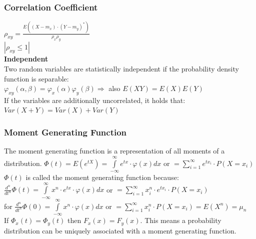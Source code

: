         \subsubsection{Correlation Coefficient}
		$\rho_{xy}=\frac{E((X-m_x)\cdot(Y-m_y)^*)}{\rho_x \rho_y}$\\
		$|\rho_{xy}\leq 1|$ \\ 
		\textbf{Independent}\\
        Two random variables are statistically independent if the probability density function is separable: \\
        $\varphi_{xy}(\alpha, \beta) = \varphi_x(\alpha)\varphi_y(\beta) \Longrightarrow$ also $E(XY)=E(X)E(Y)$ \\
        If the variables are additionally uncorrelated, it holds that: $Var(X+Y) = Var(X) + Var(Y)$


		\subsubsection{Moment Generating Function}
        The moment generating function is a representation of all moments of a distribution. 
        $\Phi(t)=E(e^{tX})=\int\limits_{-\infty}^\infty e^{tx} \cdot \varphi(x) dx$ or $= \sum\limits_{i=1}^{\infty}e^{tx_i} \cdot P(X=x_i)$  \\
        $\Phi(t)$ is called the moment generating function because: \\
        $\frac{d^n}{dt^n}\Phi(t)=\int\limits_{-\infty}^\infty x^n \cdot e^{tx} \cdot \varphi(x) dx$ or $= \sum\limits_{i=1}^{\infty} x_i^n \cdot e^{tx_i} \cdot P(X=x_i)$\\
        for $\frac{d^n}{dt^n}\Phi(0)=\int\limits_{-\infty}^\infty x^n \cdot \varphi(x) dx$ or $= \sum\limits_{i=1}^{\infty} x_i^n \cdot P(X=x_i) = E(X^n)=\mu_n $\\

        If $\Phi_x(t) = \Phi_y(t)$ then $F_x(x)=F_y(x)$. This means a probability distribution can be uniquely associated with a moment generating function.


